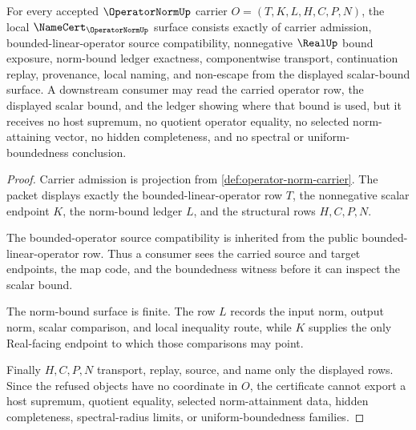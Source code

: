 \begin{theorem}
\label{thm:operator-norm-namecert-obligations}
For every accepted $\OperatorNormUp$ carrier $O=(T,K,L,H,C,P,N)$, the local $\NameCert_{\OperatorNormUp}$ surface consists exactly of carrier admission, bounded-linear-operator source compatibility, nonnegative $\RealUp$ bound exposure, norm-bound ledger exactness, componentwise transport, continuation replay, provenance, local naming, and non-escape from the displayed scalar-bound surface. A downstream consumer may read the carried operator row, the displayed scalar bound, and the ledger showing where that bound is used, but it receives no host supremum, no quotient operator equality, no selected norm-attaining vector, no hidden completeness, and no spectral or uniform-boundedness conclusion.
\end{theorem}
\begin{proof}
Carrier admission is projection from \autoref{def:operator-norm-carrier}. The packet displays exactly the bounded-linear-operator row $T$, the nonnegative scalar endpoint $K$, the norm-bound ledger $L$, and the structural rows $H,C,P,N$.

The bounded-operator source compatibility is inherited from the public bounded-linear-operator row. Thus a consumer sees the carried source and target endpoints, the map code, and the boundedness witness before it can inspect the scalar bound.

The norm-bound surface is finite. The row $L$ records the input norm, output norm, scalar comparison, and local inequality route, while $K$ supplies the only Real-facing endpoint to which those comparisons may point.

Finally $H,C,P,N$ transport, replay, source, and name only the displayed rows. Since the refused objects have no coordinate in $O$, the certificate cannot export a host supremum, quotient equality, selected norm-attainment data, hidden completeness, spectral-radius limits, or uniform-boundedness families.
\end{proof}


